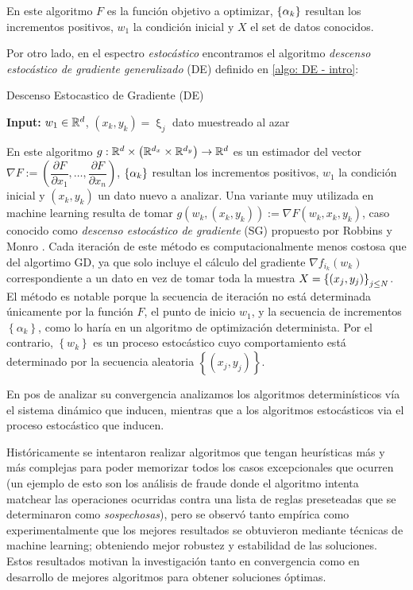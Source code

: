 En este algoritmo $F$ es la funci\'on objetivo a optimizar, $\left\lbrace\alpha_k\right\rbrace$ resultan los incrementos positivos, $w_1$ la condici\'on inicial y $X$ el set de datos conocidos. 

Por otro lado, en el espectro \textit{estoc\'astico} encontramos el algoritmo \textit{descenso estoc\'astico de gradiente generalizado} (DE) definido en \ref{algo: DE - intro}:

 \LinesNumbered
 \begin{algorithm}[H]
 	\caption{Descenso Estocastico de Gradiente (DE) \label{algo: DE - intro}}
 	\textbf{Input:} $w_1 \in {\mathbb{R}}^d$, $(x_k, y_k) = \upxi_j$ dato muestreado al azar\\
 \end{algorithm}

En este algoritmo $g : {\mathbb{R}}^d \times \left( {\mathbb{R}}^{d_x} \times {\mathbb{R}}^{d_y} \right) \rightarrow {\mathbb{R}}^d$ es un estimador del vector $\nabla F := \left(\dfrac{\partial F}{\partial x_1}, \dots, \dfrac{\partial F}{\partial x_n}\right)$, $\left\lbrace\alpha_k\right\rbrace$ resultan los incrementos positivos, $w_1$ la condici\'on inicial y $(x_k, y_k)$ un dato nuevo a analizar. Una variante muy utilizada en machine learning resulta de tomar $g(w_k, \left(x_k, y_k\right)) := \nabla F(w_k, x_k, y_k)$, caso conocido como \textit{descenso estoc\'astico de gradiente} (SG) propuesto por Robbins y Monro \cite{robbins:1951}. Cada iteraci\'on de este m\'etodo es computacionalmente menos costosa que del algortimo GD, ya que solo incluye el c\'alculo del gradiente $\nabla f_{i_k} (w_k)$ correspondiente a un dato en vez de tomar toda la muestra $X = \left\lbrace(x_j,y_j)\right\rbrace_{j \leq N}$. El m\'etodo es notable porque la secuencia de iteraci\'on no est\'a determinada \'unicamente por la funci\'on $F$, el punto de inicio $w_1$, y la secuencia de incrementos $\left\lbrace \alpha _k \right\rbrace $, como lo har\'ia en un algoritmo de optimizaci\'on determinista. Por el contrario, $\left\lbrace w_k \right\rbrace $ es un proceso estoc\'astico cuyo comportamiento est\'a determinado por la secuencia aleatoria $\left\lbrace (x_j, y_j) \right\rbrace $.

En pos de analizar su convergencia analizamos los algoritmos determin\'isticos v\'ia el sistema din\'amico que inducen, mientras que a los algoritmos estoc\'asticos via el proceso estoc\'astico que inducen.

Hist\'oricamente se intentaron realizar algoritmos que tengan heur\'isticas m\'as y m\'as complejas para poder memorizar todos los casos excepcionales que ocurren (un ejemplo de esto son los an\'alisis de fraude donde el algoritmo intenta matchear las operaciones ocurridas contra una lista de reglas preseteadas que se determinaron como \textit{sospechosas}), pero se observ\'o tanto emp\'irica como experimentalmente que los mejores resultados se obtuvieron mediante t\'ecnicas de machine learning; obteniendo mejor robustez y estabilidad de las soluciones. Estos resultados motivan la investigaci\'on tanto en convergencia como en desarrollo de mejores algoritmos para obtener soluciones \'optimas.


